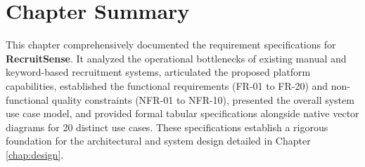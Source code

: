 \section{Chapter Summary}
This chapter comprehensively documented the requirement specifications for \textbf{RecruitSense}. It analyzed the operational bottlenecks of existing manual and keyword-based recruitment systems, articulated the proposed platform capabilities, established the functional requirements (FR-01 to FR-20) and non-functional quality constraints (NFR-01 to NFR-10), presented the overall system use case model, and provided formal tabular specifications alongside native vector diagrams for 20 distinct use cases. These specifications establish a rigorous foundation for the architectural and system design detailed in Chapter \ref{chap:design}.
